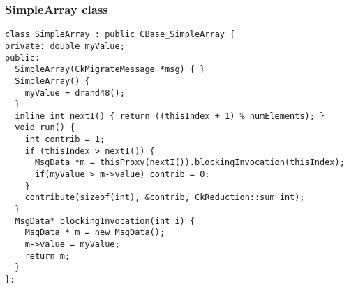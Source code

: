 \begin{frame}[fragile]
\frametitle{SimpleArray class}
\begin{lstlisting}[basicstyle=\scriptsize]
class SimpleArray : public CBase_SimpleArray {
private: double myValue;
public:
  SimpleArray(CkMigrateMessage *msg) { }
  SimpleArray() {
    myValue = drand48();
  }
  inline int nextI() { return ((thisIndex + 1) % numElements); }
  void run() {
    int contrib = 1;
    if (thisIndex > nextI()) {
      MsgData *m = thisProxy(nextI()).blockingInvocation(thisIndex);
      if(myValue > m->value) contrib = 0;
    }
    contribute(sizeof(int), &contrib, CkReduction::sum_int);
  }
  MsgData* blockingInvocation(int i) {
    MsgData * m = new MsgData();
    m->value = myValue;
    return m;
  }
};
\end{lstlisting}
\end{frame}
